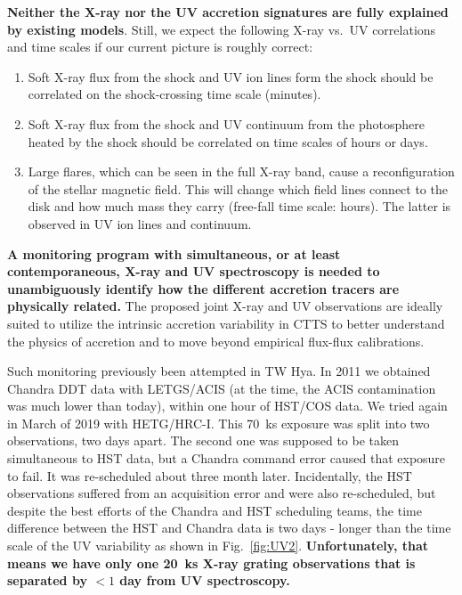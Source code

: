 \documentclass[letterpaper,11pt,twocolumn]{article}
\begin{document}

{\bf Neither the X-ray nor the UV accretion signatures are fully explained by existing models}. Still, we expect the following X-ray vs.\ UV correlations and time scales if our current picture is roughly correct:
\begin{enumerate}
    \itemsep1pt
    \item Soft X-ray flux from the shock and UV ion lines form the shock should be correlated on the shock-crossing time scale (minutes).
    \item Soft X-ray flux from the shock and UV continuum from the photosphere heated by the shock should be correlated on time scales of hours or days.
    \item Large flares, which can be seen in the full X-ray band, cause a reconfiguration of the stellar magnetic field. This will change which field lines connect to the disk and how much mass they carry (free-fall time scale: hours). The latter is observed in UV ion lines and continuum.
\end{enumerate}

\textbf{A monitoring program with simultaneous, or at least contemporaneous, X-ray and UV spectroscopy
is needed to unambiguously identify how the different 
accretion tracers are physically related.} The proposed joint X-ray and UV observations are ideally
suited to utilize the intrinsic accretion variability in
CTTS to better understand the physics of accretion and to move beyond 
empirical flux-flux calibrations. 

Such monitoring previously been attempted in TW Hya. In 2011 we obtained Chandra DDT
data with LETGS/ACIS (at the time, the ACIS contamination was much lower than
today), within one hour of HST/COS data.
We tried again in March of 2019 with HETG/HRC-I. This 70~ks exposure was split into two
observations, two days apart. The second one was supposed to be taken simultaneous to HST data,
but a Chandra command error caused that exposure to fail. It was
re-scheduled about three month later. Incidentally, the HST observations
suffered from an acquisition error and were also re-scheduled, but despite the
best efforts of the Chandra and HST scheduling teams, the time difference
between the HST and Chandra data is two days - longer than the time scale of the
UV variability as shown in Fig.~\ref{fig:UV2}. \textbf{Unfortunately, that
  means we have only one 20~ks X-ray grating observations that is separated by
  $<1$ day from UV spectroscopy.}
\end{document}
